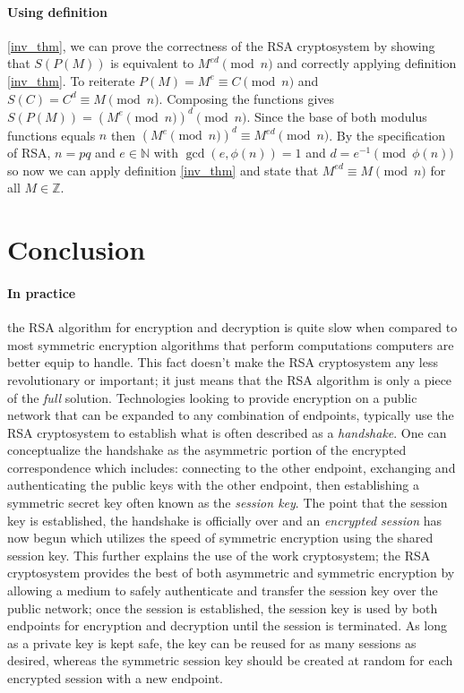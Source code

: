 \documentclass[12pt]{article}
\newcommand{\Z}{\mathbb{Z}}
\newcommand{\N}{\mathbb{N}}
\theoremstyle{remark}
\begin{document}
\paragraph{Using definition} \ref{inv_thm}, we can prove the correctness of the RSA cryptosystem by showing that $S(P(M))$ is equivalent to $M^{ed} \pmod{n}$ and correctly applying definition \ref{inv_thm}.  To reiterate $P(M) = M^e \equiv C \pmod{n}$ and $S(C) = C^d \equiv M \pmod{n}$.  Composing the functions gives $S(P(M))= (M^e \pmod{n})^d \pmod{n}$.  Since the base of both modulus functions equals $n$ then $(M^e \pmod{n})^d \equiv M^{ed} \pmod{n}$.  By the specification of RSA, $n=pq$ and $e \in \N$ with $\gcd(e, \phi(n))=1$ and $d = e^{-1} \pmod{\phi(n)}$ so now we can apply definition \ref{inv_thm} and state that $M^{ed} \equiv M \pmod{n}$ for all $M\in \Z$.


\section{Conclusion}

\paragraph{In practice} the RSA algorithm for encryption and decryption is quite slow when compared to most symmetric encryption algorithms that perform computations computers are better equip to handle.  This fact doesn't make the RSA cryptosystem any less revolutionary or important; it just means that the RSA algorithm is only a piece of the \emph{full} solution.  Technologies looking to provide encryption on a public network that can be expanded to any combination of endpoints, typically use the RSA cryptosystem to establish what is often described as a \textit{handshake}.  One can conceptualize the handshake as the asymmetric portion of the encrypted correspondence which includes: connecting to the other endpoint, exchanging and authenticating the public keys with the other endpoint, then establishing a symmetric secret key often known as the \textit{session key}.  The point that the session key is established, the handshake is officially over and an \textit{encrypted session} has now begun which utilizes the speed of symmetric encryption using the shared session key.  This further explains the use of the work cryptosystem; the RSA cryptosystem provides the best of both asymmetric and symmetric encryption by allowing a medium to safely authenticate and transfer the session key over the public network; once the session is established, the session key is used by both endpoints for encryption and decryption until the session is terminated.  As long as a private key is kept safe, the key can be reused for as many sessions as desired, whereas the symmetric session key should be created at random for each encrypted session with a new endpoint.
\end{document}
